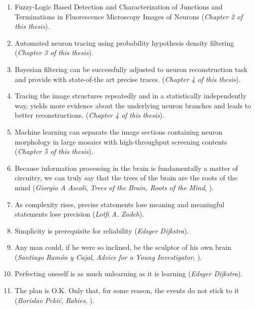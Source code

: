 \documentclass[10pt]{report}
\begin{document}
\begin{enumerate}
  
\item Fuzzy-Logic Based Detection and Characterization of Junctions and Terminations in Fluorescence Microscopy Images of Neurons 
(\emph{Chapter 2 of this thesis}). 
  
\medskip
  
\item Automated neuron tracing using probability hypothesis density filtering
	(\emph{Chapter 3 of this thesis}).  
  
\medskip
\item Bayesian filtering can be successfully adjusted to neuron reconstruction task and provide with state-of-the art precise traces. 
	(\emph{Chapter 4 of this thesis}).
	
\medskip
\item Tracing the image structures repeatedly and in a statistically independently way, yields more evidence about the underlying neuron branches and leads to better reconstructions.
	(\emph{Chapter 4 of this thesis}).

\medskip
\item Machine learning can separate the image sections containing neuron morphology in large mosaics with high-throughput screening contents (\emph{Chapter 5 of this thesis}). 

\medskip

\item Because information processing in the brain is fundamentally a matter of circuitry, we can truly say that the trees of the brain are the roots of the mind (\emph{Giorgio A Ascoli}, \emph{Trees of the Brain, Roots of the Mind}, ). 

\medskip 

\item As complexity rises, precise statements lose meaning and meaningful statements lose precision (\emph{Lotfi A. Zadeh}). 

\medskip
  
\item Simplicity is prerequisite for reliability (\emph{Edsger Dijkstra}).

\medskip

\item Any man could, if he were so inclined, be the sculptor of his own brain (\emph{Santiago Ram\'{o}n y Cajal}, \emph{Advice for a Young Investigator}, ).

\medskip

\item Perfecting oneself is as much unlearning as it is learning (\emph{Edsger Dijkstra}).

\medskip

\item The plan is O.K. Only that, for some reason, the events do not stick to it (\emph{Borislav Peki\'{c}}, \emph{Rabies}, ).

\end{enumerate}

\end{document}
